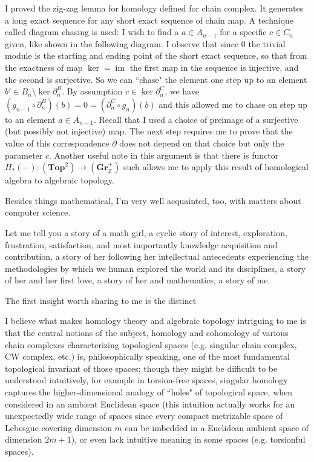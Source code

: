 \documentclass[10pt]{article}
\begin{document}
\begin{CJK*}{UTF8}{gbsn}
I proved the zig-zag lemma for homology defined for chain complex. It generates a long exact sequence for any short exact sequence of chain map. A technique called diagram chasing is used: I wish to find a $a\in A_{n-1}$ for a specific $c\in C_n$ given, like shown in the following diagram. I observe that since $0$ the trivial module is the starting and ending point of the short exact sequence, so that from the exactness of map $\ker=\operatorname{im}$ the first map in the sequence is injective, and the second is surjective. So we can ``chase" the element one step up to an element $b'\in B_n\setminus\ker\partial_n^B$. By assumption $c\in\ker\partial_n^C$, we have $(g_{n-1}\circ\partial_n^B)(b)=0=(\partial_n^C\circ g_n)(b)$ and this allowed me to chase on step up to an element $a\in A_{n-1}$. Recall that I used a choice of preimage of a surjective (but possibly not injective) map. The next step requires me to prove that the value of this correspondence $\partial$ does not depend on that choice but only the parameter $c$. Another useful note in this argument is that there is functor $H_*(-):(\mathbf{Top}^2)\to(\mathbf{Gr}_{\mathbb{Z}}^+)$ such allows me to apply this result of homological algebra to algebraic topology.

Besides things mathematical, I'm very well acquainted, too, with matters about computer science.

\newpage
Let me tell you a story of a math girl, a cyclic story of interest, exploration, frustration, satisfaction, and most importantly knowledge acquisition and contribution, a story of her following her intellectual antecedents experiencing the methodologies by which we human explored the world and its disciplines, a story of her and her first love, a story of her and mathematics, a story of me.

The first insight worth sharing to me is the distinct 

I believe what makes homology theory and algebraic topology intriguing to me is that the central notions of the subject, homology and cohomology of various chain complexes characterizing topological spaces (e.g. singular chain complex, CW complex, etc.) is, philosophically speaking, one of the most fundamental topological invariant of those spaces; though they might be difficult to be understood intuitively, for example in torsion-free spaces, singular homology captures the higher-dimensional analogy of ``holes" of topological space, when considered in an ambient Euclidean space (this intuition actually works for an unexpectedly wide range of spaces since every compact metrizable space of Lebesgue covering dimension $m$ can be imbedded in a Euclidean ambient space of dimension $2m+1$), or even lack intuitive meaning in some spaces (e.g. torsionful spaces).


\end{CJK*}
\end{document}
